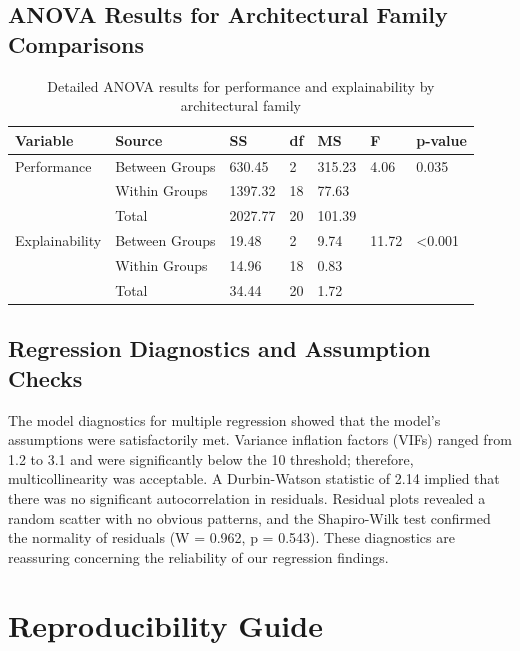\documentclass[preprint,12pt]{elsarticle}
\begin{document}
\subsection{ANOVA Results for Architectural Family Comparisons}
\begin{table}[ht!]
\centering
\caption{Detailed ANOVA results for performance and explainability by architectural family}
\label{tab:anova_details}
\begin{tabularx}{\textwidth}{@{}l XXXXXX @{}}
\toprule
\textbf{Variable} & \textbf{Source} & \textbf{SS} & \textbf{df} & \textbf{MS} & \textbf{F} & \textbf{p-value} \\
\midrule
Performance & Between Groups & 630.45 & 2 & 315.23 & 4.06 & 0.035 \\
 & Within Groups & 1397.32 & 18 & 77.63 &  &  \\
 & Total & 2027.77 & 20 & 101.39 &  &  \\
\addlinespace
Explainability & Between Groups & 19.48 & 2 & 9.74 & 11.72 & <0.001 \\
 & Within Groups & 14.96 & 18 & 0.83 &  &  \\
 & Total & 34.44 & 20 & 1.72 &  &  \\
\bottomrule
\end{tabularx}
\end{table}

\subsection{Regression Diagnostics and Assumption Checks}

The model diagnostics for multiple regression showed that the model's assumptions were satisfactorily met. Variance inflation factors (VIFs) ranged from 1.2 to 3.1 and were significantly below the 10 threshold; therefore, multicollinearity was acceptable. A Durbin-Watson statistic of 2.14 implied that there was no significant autocorrelation in residuals. Residual plots revealed a random scatter with no obvious patterns, and the Shapiro-Wilk test confirmed the normality of residuals (W = 0.962, p = 0.543). These diagnostics are reassuring concerning the reliability of our regression findings.

\section{Reproducibility Guide}
\label{app:reproducibility}
\end{document}
